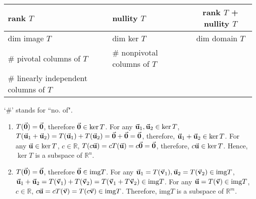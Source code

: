 \documentclass{article}
\begin{document}
\begin{exercise}{3}
\begin{center}
\begin{tabular}{|L|I|c|}
\hline
rank $T$ & nullity $T$ & rank $T$ + nullity $T$\\
\hline
dim image $T$ & dim ker $T$ & dim domain $T$ \\
\hline
\# pivotal columns of $T$ & \# nonpivotal columns of $T$ & \\
\hline
\# linearly independent columns of $T$ && \\
\hline
\end{tabular}
\end{center}

`\#' stands for ``no. of".
\end{exercise}

\def \img{\mathrm{img}}

\begin{exercise}{5}
\begin{enumerate}
\item $T(\vec{\mathbf{0}}) = \vec{\mathbf{0}}$, therefore $\vec{\mathbf{0}} \in \ker T$.
  For any $\vec{\mathbf{u}}_1, \vec{\mathbf{u}}_2 \in \ker T$, $T(\vec{\mathbf{u}}_1 + \vec{\mathbf{u}}_2) = T(\vec{\mathbf{u}}_1) + T(\vec{\mathbf{u}}_2) = \vec{\mathbf{0}} + \vec{\mathbf{0}} = \vec{\mathbf{0}}$, therefore, $\vec{\mathbf{u}}_1 + \vec{\mathbf{u}}_2 \in \ker T$.
  For any $\vec{\mathbf{u}} \in \ker T$, $c \in \mathbb{R}$, $T(c\vec{\mathbf{u}}) = c T(\vec{\mathbf{u}}) = c\vec{\mathbf{0}} = \vec{\mathbf{0}}$, therefore, $c\vec{\mathbf{u}} \in \ker T$.
  Hence, $\ker T$ is a subspace of $\mathbb{R}^n$. \rQED

\item $T(\vec{\mathbf{0}}) = \vec{\mathbf{0}}$, therefore $\Vect{0} \in \img T$. For any $\Vect{u}_1 = T(\Vect{v}_1), \Vect{u}_2 = T(\Vect{v}_2) \in \img T$, $\Vect{u}_1 + \Vect{u}_2 = T(\Vect{v}_1) + T(\Vect{v}_2) = T(\Vect{v}_1 + T\Vect{v}_2) \in \img T$. For any $\Vect{u} = T(\Vect{v}) \in \img T$, $c \in \mathbb{R}$, $c\Vect{u} = cT(\Vect{v}) = T(c\Vect{v}) \in \img T$. Therefore, $\img T$ is a subspace of $\mathbb{R}^m$. \rQED
\end{enumerate}
\end{exercise}
\end{document}
